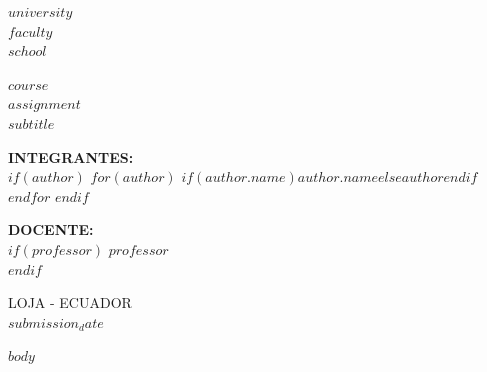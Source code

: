 \documentclass[$if(fontsize)$$fontsize$$else$12pt$endif$,$if(lang)$$lang$$else$spanish$endif$]{$if(documentclass)$$documentclass$$else$article$endif$}
\begin{document}
\begin{titlepage}
\thispagestyle{fancy}
\begin{center}
    \vspace*{1cm}
    {\bfseries \Large $university$}\\[0.5cm]
    {\bfseries \large $faculty$}\\[0.3cm]
    {\bfseries $school$}\\[0.5cm]
    
    \vfill
    
    {\bfseries \large $course$}\\[1cm]
    
    {\bfseries \Huge $assignment$}\\[0.5cm]
    {\large $subtitle$}\\[1cm]
    
    \vfill
    
    {\bfseries \large INTEGRANTES:}\\[0.5cm]
    $if(author)$
        $for(author)$
            {\large $if(author.name)$$author.name$$else$$author$$endif$}\\[0.2cm]
        $endfor$
    $endif$
    
    \vfill
    
    {\bfseries \large DOCENTE:}\\[0.3cm]
    $if(professor)$ {\large $professor$} \\[0.5cm] $endif$
    
    \vfill
    
    {\large LOJA - ECUADOR}\\[0.3cm]
    {\large $submission_date$}
    \vspace*{1.5cm}
\end{center}
\end{titlepage}
\newpage

\vspace{1cm}

\onehalfspacing
\setlength{\parindent}{1.27cm}

$body$
\end{document}
